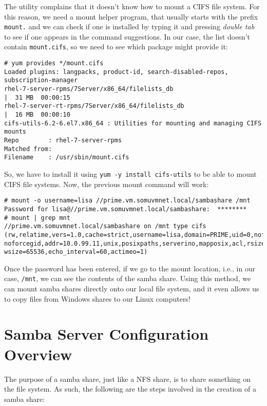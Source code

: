 \noindent
The utility complains that it doesn't know how to mount a CIFS file system. For this reason, we need a mount helper program, that usually starts with the prefix \verb|mount.| and we can check if one is installed by typing it and pressing \textit{double tab} to see if one appears in the command suggestions. In our case, the list doesn't contain \verb|mount.cifs|, so we need to see which package might provide it:

\vspace{-15pt}
\begin{verbatim}
# yum provides */mount.cifs
Loaded plugins: langpacks, product-id, search-disabled-repos, subscription-manager
rhel-7-server-rpms/7Server/x86_64/filelists_db                                                         |  31 MB  00:00:15     
rhel-7-server-rt-rpms/7Server/x86_64/filelists_db                                                      |  16 MB  00:00:10     
cifs-utils-6.2-6.el7.x86_64 : Utilities for mounting and managing CIFS mounts
Repo        : rhel-7-server-rpms
Matched from:
Filename    : /usr/sbin/mount.cifs
\end{verbatim}
\vspace{-10pt}	

\noindent
So, we have to install it using \verb|yum -y install cifs-utils| to be able to mount CIFS file systems. Now, the previous mount command will work:

\vspace{-15pt}
\begin{verbatim}
# mount -o username=lisa //prime.vm.somuvmnet.local/sambashare /mnt
Password for lisa@//prime.vm.somuvmnet.local/sambashare:  ********
# mount | grep mnt
//prime.vm.somuvmnet.local/sambashare on /mnt type cifs (rw,relatime,vers=1.0,cache=strict,username=lisa,domain=PRIME,uid=0,noforceuid,gid=0, noforcegid,addr=10.0.99.11,unix,posixpaths,serverino,mapposix,acl,rsize=1048576, wsize=65536,echo_interval=60,actimeo=1)
\end{verbatim}
\vspace{-10pt}	

\noindent
Once the password has been entered, if we go to the mount location, i.e., in our case, \verb|/mnt|, we can see the contents of the samba share. Using this method, we can mount samba shares directly onto our local file system, and it even allows us to copy files from Windows shares to our Linux computers!

\section{Samba Server Configuration Overview}
The purpose of a samba share, just like a NFS share, is to share something on the file system. As such, the following are the steps involved in the creation of a samba share:

